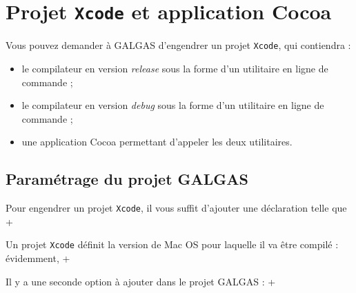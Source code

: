 
\chapter{Projet \texttt{Xcode} et application Cocoa}

Vous pouvez demander à GALGAS d'engendrer un projet \texttt{Xcode}, qui contiendra :
\begin{itemize}
  \item le compilateur en version \emph{release} sous la forme d'un utilitaire en ligne de commande ; 
  \item le compilateur en version \emph{debug} sous la forme d'un utilitaire en ligne de commande ; 
  \item une application Cocoa permettant d'appeler les deux utilitaires.
\end{itemize}






\section{Paramétrage du projet GALGAS}

Pour engendrer un projet \texttt{Xcode}, il vous suffit d'ajouter une déclaration telle que \ggs+%

\begin{galgas}
project (0:0:1) -> "logo" {
  ...
\end{galgas}

Un projet \texttt{Xcode} définit la version de Mac OS pour laquelle il va être compilé : évidemment, \ggs+%

Il y a une seconde option à ajouter dans le projet GALGAS : \ggs+%


